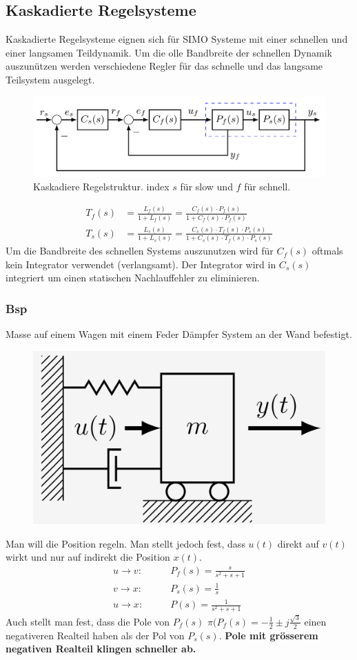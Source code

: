 \subsection{Kaskadierte Regelsysteme}
    Kaskadierte Regelsysteme eignen sich für SIMO Systeme mit einer schnellen und einer langsamen Teildynamik. Um die olle Bandbreite der schnellen Dynamik auszunützen werden verschiedene Regler für das schnelle und das langsame Teilsystem ausgelegt.
    
    \begin{figure}[H]
        \centering
        \includegraphics[width = 0.7\linewidth]{images/04/kaskad_sys.jpeg}
        \caption{Kaskadiere Regelstruktur. index $s$ für slow und $f$ für schnell.}
    \end{figure}
    \begin{align*}
        T_{f}(s) &= \frac{L_f(s)}{1 + L_f(s)} = \frac{C_f(s)\cdot P_f(s)}{1 + C_f(s)\cdot P_f(s)}\\
        T_{s}(s) &= \frac{L_s(s)}{1 + L_s(s)} = \frac{C_s(s)\cdot T_{f}(s)\cdot P_s(s)}{1 + C_s(s)\cdot T_f(s) \cdot P_s(s)}
    \end{align*}
    Um die Bandbreite des schnellen Systems auszunutzen wird für $C_f(s)$ oftmals kein Integrator verwendet (verlangsamt). Der Integrator wird in $C_s(s)$ integriert um einen statischen Nachlauffehler zu eliminieren.
    
    \subsubsection{Bsp}
        Masse auf einem Wagen mit einem Feder Dämpfer System an der Wand befestigt.
        \begin{figure}[H]
            \centering
            \includegraphics[width = 0.25\linewidth]{images/04/kask_bsp.jpeg}
        \end{figure}
        Man will die Position regeln. Man stellt jedoch fest, dass $u(t)$ direkt auf $v(t)$ wirkt und nur auf indirekt die Position $x(t)$.
        \begin{align*}
            u\rightarrow v: \qquad &P_f(s) = \frac{s}{s^2+s+1}\\
            v\rightarrow x: \qquad &P_s(s) = \frac{1}{s}\\
            u\rightarrow x: \qquad &P(s) = \frac{1}{s^2+s+1}
        \end{align*}
        Auch stellt man fest, dass die Pole von $P_f(s)$ $\pi(P_f(s) = -\frac{1}{2}\pm j\frac{\sqrt{3}}{2}$ einen negativeren Realteil haben als der Pol von $P_s(s)$. \textbf{Pole mit grösserem negativen Realteil klingen schneller ab.}
        

